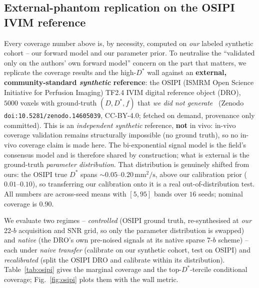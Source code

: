 \documentclass[11pt]{article}
\newcommand{\Dstar}{D^{*}}
\begin{document}
\subsection{External-phantom replication on the OSIPI IVIM reference}
\label{sec:osipi}
Every coverage number above is, by necessity, computed on \emph{our} labeled
synthetic cohort -- our forward model and our parameter prior. To neutralise the
``validated only on the authors' own forward model'' concern on the part that
matters, we replicate the coverage results and the high-$\Dstar$ wall against an
\textbf{external, community-standard \emph{synthetic} reference}: the OSIPI
(ISMRM Open Science Initiative for Perfusion Imaging) TF2.4 IVIM digital reference
object (DRO), $5000$ voxels with ground-truth $(D,\Dstar,f)$ that \emph{we did not
generate}~\citep{osipi_ivim} (Zenodo \texttt{doi:10.5281/zenodo.14605039},
CC-BY-4.0; fetched on demand, provenance only committed). This is an
\emph{independent synthetic} reference, \textbf{not} in vivo: in-vivo coverage
validation remains structurally impossible (no ground truth), so no in-vivo
coverage claim is made here. The bi-exponential signal model is the field's
consensus model and is therefore shared by construction; what is external is the
ground-truth \emph{parameter distribution}. That distribution is genuinely shifted
from ours: the OSIPI true $\Dstar$ spans $\sim\!0.05$--$0.20\,\mathrm{mm^2/s}$,
above our calibration prior ($0.01$--$0.10$), so transferring our calibration onto
it is a real out-of-distribution test. All numbers are across-seed means with
$[5,95]$ bands over $16$ seeds; nominal coverage is $0.90$.

We evaluate two regimes -- \emph{controlled} (OSIPI ground truth, re-synthesised at
\emph{our} 22-$b$ acquisition and SNR grid, so only the parameter distribution is
swapped) and \emph{native} (the DRO's own pre-noised signals at its native sparse
7-$b$ scheme) -- each under \emph{naive transfer} (calibrate on our synthetic
cohort, test on OSIPI) and \emph{recalibrated} (split the OSIPI DRO and calibrate
within its distribution). Table~\ref{tab:osipi} gives the marginal coverage and the
top-$\Dstar$-tercile conditional coverage; Fig.~\ref{fig:osipi} plots them with the
wall metric.
\end{document}

